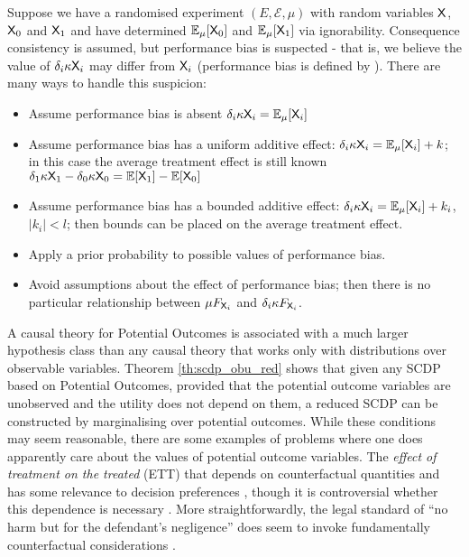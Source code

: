 \begin{example}\label{ex:nonst_distn}
Suppose we have a randomised experiment $(E,\mathcal{E},\mu)$ with random variables $\mathsf{X}$, $\mathsf{X}_0$ and $\mathsf{X}_1$ and have determined $\mathbb{E}_\mu[\mathsf{X}_0]$ and $\mathbb{E}_\mu[\mathsf{X}_1]$ via ignorability. Consequence consistency is assumed, but performance bias is suspected - that is, we believe the value of $\delta_i \kappa \mathsf{X}_i$ may differ from $\mathsf{X}_i$ (performance bias is defined by \cite{collaboration_cochrane_nodate}). There are many ways to handle this suspicion:
\begin{itemize}
    \item Assume performance bias is absent $\delta_i \kappa \mathsf{X}_i = \mathbb{E}_\mu[\mathsf{X}_i]$
    \item Assume performance bias has a uniform additive effect: $\delta_i \kappa \mathsf{X}_i = \mathbb{E}_\mu[\mathsf{X}_i]+k$; in this case the average treatment effect is still known $\delta_1 \kappa \mathsf{X}_1 - \delta_0\kappa\mathsf{X}_0 = \mathbb{E}[\mathsf{X}_1]-\mathbb{E}[\mathsf{X}_0]$
    \item Assume performance bias has a bounded additive effect: $\delta_i \kappa \mathsf{X}_i = \mathbb{E}_\mu[\mathsf{X}_i]+k_i$, $|k_i|<l$; then bounds can be placed on the average treatment effect.
    \item Apply a prior probability to possible values of performance bias.
    \item Avoid assumptions about the effect of performance bias; then there is no particular relationship between $\mu F_{\mathsf{X}_i}$ and $\delta_i \kappa F_{\mathsf{X}_i}$.
\end{itemize}

\end{example}

A causal theory for Potential Outcomes is associated with a much larger hypothesis class than any causal theory that works only with distributions over observable variables. Theorem \ref{th:scdp_obu_red} shows that given any SCDP based on Potential Outcomes, provided that the potential outcome variables are unobserved and the utility does not depend on them, a reduced SCDP can be constructed by marginalising over potential outcomes. While these conditions may seem reasonable, there are some examples of problems where one does apparently care about the values of potential outcome variables. The \emph{effect of treatment on the treated} (ETT) that depends on counterfactual quantities and has some relevance to decision preferences \cite{rubin_estimating_1974}, though it is controversial whether this dependence is necessary \cite{geneletti2007defining}. More straightforwardly, the legal standard of ``no harm but for the defendant's negligence'' does seem to invoke fundamentally counterfactual considerations \cite{pearl_causality:_2009}.

